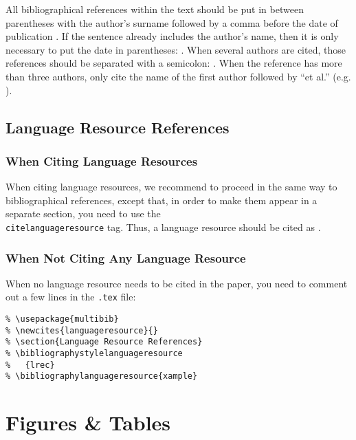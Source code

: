\documentclass[10pt, a4paper]{article}
\begin{document}
All bibliographical references within the text should be put in between
parentheses with the author's surname followed by a comma before the date
of publication \cite{Martin-90}. If the sentence already includes the author's
name, then it is only necessary to put the date in parentheses:
. When several authors are cited, those references should be
separated with a semicolon: \cite{Martin-90,CastorPollux-92}. When the reference
has more than three authors, only cite the name of the first author followed by
``et al.'' (e.g. \cite{Superman-Batman-Catwoman-Spiderman-00}).

\subsection{Language Resource References}

\subsubsection{When Citing Language Resources}

When citing language resources, we recommend to proceed in the same way to
bibliographical references, except that, in order to make them appear in
a separate section, you need to use the \texttt{\\citelanguageresource} tag.
Thus, a language resource should be cited as .


\subsubsection{When Not Citing Any Language Resource}

When no language resource needs to be cited in the paper, you need to comment
out a few lines in the \texttt{.tex} file:

\begin{verbatim}
% \usepackage{multibib}
% \newcites{languageresource}{}
% \section{Language Resource References}
% \bibliographystylelanguageresource
%   {lrec}
% \bibliographylanguageresource{xample}
\end{verbatim}

\section{Figures \& Tables}
\end{document}
